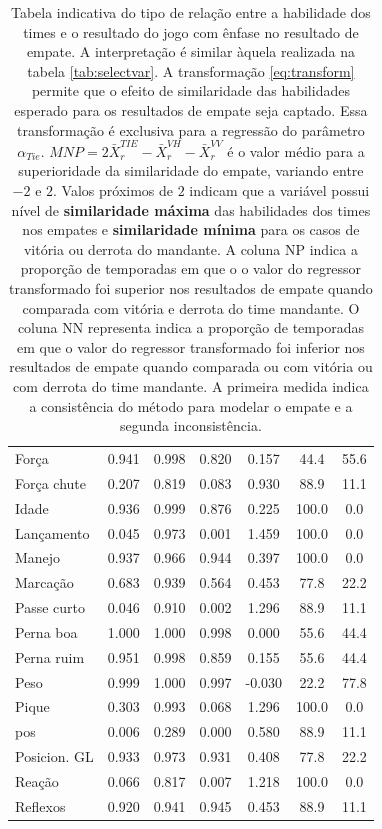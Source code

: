 \documentclass[review]{elsarticle}
\begin{document}
\begin{table}[ht]
\begin{small}
\begin{tabular}{l||rrr||cc|||c}
\rowcolor{gray!10!} Força & 0.941 & 0.998 & 0.820 & 0.157 & 44.4 & 55.6 \\ 
\rowcolor{gray!30!} Força chute & 0.207 & 0.819 & 0.083 & 0.930 & 88.9 & 11.1 \\ 
\rowcolor{gray!10!} Idade & 0.936 & 0.999 & 0.876 & 0.225 & 100.0 & 0.0 \\ 
\rowcolor{gray!30!} Lançamento & 0.045 & 0.973 & 0.001 & 1.459 & 100.0 & 0.0 \\ 
\rowcolor{gray!10!} Manejo & 0.937 & 0.966 & 0.944 & 0.397 & 100.0 & 0.0 \\ 
\rowcolor{gray!30!} Marcação & 0.683 & 0.939 & 0.564 & 0.453 & 77.8 & 22.2 \\ 
\rowcolor{gray!10!} Passe curto & 0.046 & 0.910 & 0.002 & 1.296 & 88.9 & 11.1 \\ 
\rowcolor{gray!30!} Perna boa & 1.000 & 1.000 & 0.998 & 0.000 & 55.6 & 44.4 \\ 
\rowcolor{gray!10!} Perna ruim & 0.951 & 0.998 & 0.859 & 0.155 & 55.6 & 44.4 \\ 
\rowcolor{gray!30!} Peso & 0.999 & 1.000 & 0.997 & -0.030 & 22.2 & 77.8 \\ 
\rowcolor{gray!10!} Pique & 0.303 & 0.993 & 0.068 & 1.296 & 100.0 & 0.0 \\ 
\rowcolor{gray!30!} pos & 0.006 & 0.289 & 0.000 & 0.580 & 88.9 & 11.1 \\ 
\rowcolor{gray!10!} Posicion. GL & 0.933 & 0.973 & 0.931 & 0.408 & 77.8 & 22.2 \\ 
\rowcolor{gray!30!} Reação & 0.066 & 0.817 & 0.007 & 1.218 & 100.0 & 0.0 \\ 
\rowcolor{gray!10!} Reflexos & 0.920 & 0.941 & 0.945 & 0.453 & 88.9 & 11.1 \\ 
   \hline
\end{tabular}
\end{small}
\caption[\scriptsize{Variable selection with transformation.}]{\scriptsize{ Tabela indicativa do tipo de relação entre a habilidade dos times e o resultado do jogo com ênfase no resultado de empate. A interpretação é similar àquela realizada na tabela \ref{tab:selectvar}. A transformação \ref{eq:transform} permite que o efeito de similaridade das habilidades esperado para os resultados de empate seja captado. Essa transformação é exclusiva para a regressão do parâmetro $\alpha_{Tie}$. $ MNP = 2  \bar{X}_r^{TIE} - \bar{X}_r^{VH} - \bar{X}_r^{VV}$ é o valor médio para a superioridade da similaridade do empate, variando entre $-2$ e $2$. Valos próximos de $2$ indicam que a variável possui nível de \textbf{similaridade máxima} das habilidades dos times nos empates e \textbf{similaridade mínima} para os casos de vitória ou derrota do mandante. A coluna NP indica a proporção de temporadas em que o o valor do regressor transformado foi superior nos resultados de empate quando comparada com vitória e derrota do time mandante. O coluna NN representa indica a proporção de temporadas em que o valor do regressor transformado foi inferior nos resultados de empate quando comparada ou com vitória ou com derrota do time mandante. A primeira medida indica a  consistência do método para modelar o empate e a segunda inconsistência.}}

\end{table}
\end{document}
